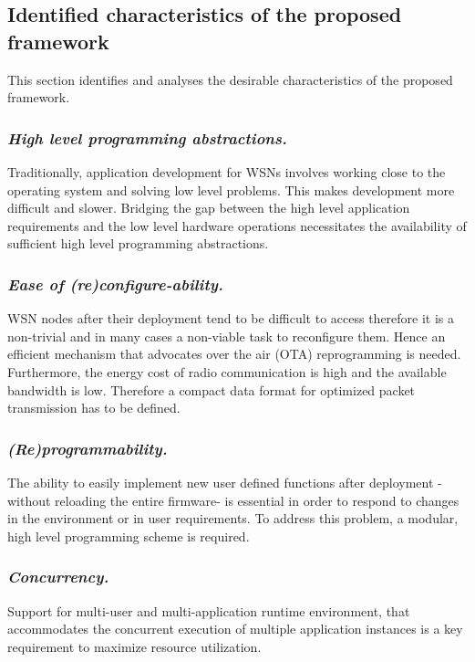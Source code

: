 \subsection{Identified characteristics of the proposed framework}
This section identifies and analyses the desirable characteristics of the proposed framework.

	\subsubsection{ \textbf{\emph{High level programming abstractions.}}} Traditionally, application development for WSNs involves working close to the operating system and solving low level problems. This makes development more difficult and slower. Bridging the gap between the high level application requirements and the low level hardware operations necessitates the availability of sufficient high level programming abstractions.
	
	\subsubsection{ \textbf{\emph{Ease of (re)configure-ability.}}} WSN nodes after their deployment tend to be difficult to access therefore it is a non-trivial and in many cases a non-viable task to reconfigure them. Hence an efficient mechanism that advocates over the air (OTA) reprogramming is needed. Furthermore, the energy cost of radio communication is high and the available bandwidth is low. Therefore a compact data format for optimized packet transmission has to be defined.
	
	\subsubsection{ \textbf{\emph{(Re)programmability.}}} The ability to easily implement new user defined functions after deployment -without reloading the entire firmware- is essential in order to respond to changes in the environment or in user requirements. To address this problem, a modular, high level programming scheme is required.   
	
	\subsubsection{ \textbf{\emph{Concurrency.}}} Support for multi-user and multi-application runtime environment, that accommodates the concurrent execution of multiple application instances is a key requirement to maximize resource utilization.
	
